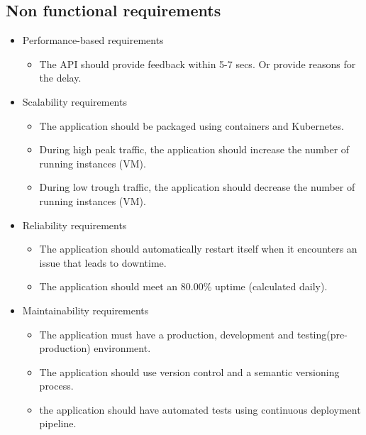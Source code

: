 \documentclass{article}
\begin{document}
\subsection{Non functional requirements}
\begin{itemize}
    \item Performance-based requirements
    \begin{itemize}
        \item The API should provide feedback within 5-7 secs. Or provide reasons for the delay.
    \end{itemize}
    \item Scalability requirements 
    \begin{itemize}
        \item The application should be packaged using containers and Kubernetes.
        \item During high peak traffic, the application should increase the number of running instances (VM).
        \item During low trough traffic, the application should decrease the number of running instances (VM).
    \end{itemize}
    \item Reliability requirements 
    \begin{itemize}
        \item The application should automatically restart itself when it encounters an issue that leads to downtime.
        \item The application should meet an 80.00\% uptime (calculated daily).
    \end{itemize}
    \item Maintainability requirements
    \begin{itemize}
        \item The application must have a production, development and testing(pre-production) environment.
        \item The application should use version control and a semantic versioning process.
        \item the application should have automated tests using continuous deployment pipeline.
    \end{itemize}
    \end{itemize}
\end{document}
